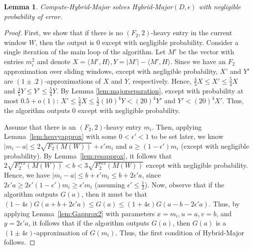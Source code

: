 \documentclass[11pt]{article}
\newtheorem{lem}{Lemma}
\begin{document}
\begin{lem}\label{lem:hybridmajor}
Compute-Hybrid-Major solves Hybrid-Major$(D, \epsilon)$ with negligible probability of error.
\end{lem}
\begin{proof}

First, we show that if there is no $(F_2,2)$-heavy entry in the current window $W$, then the output
is $0$ except with negligible probability.  Consider a single iteration of the main loop of the algorithm.
Let $M'$ be the vector with entries $m_i^2$ and denote
$X = \langle M', H \rangle, Y = |M'| - \langle M', H \rangle$.
Since we have an $F_2$ approximation over sliding windows, except with negligible probability, $X'$ and $Y'$ are $(1 \pm .2)$-approximations
of $X$ and $Y$, respectively.  Hence, $\frac{4}{5}X \leq X' \leq \frac{5}{4}X$ and $\frac{4}{5}Y \leq Y' \leq \frac{5}{4}Y$.
By Lemma \ref{lem:majorseparation}, except with probability at most $0.5+o(1)$:
$X' \le \frac{5}{4} X \le \frac{5}{2} (10)^4 Y < (20)^4  Y'$ and $Y' < (20)^4 X'$.
Thus, the algorithm outputs $0$ except with negligible probability.

Assume that there is an $(F_2,2)$-heavy entry $m_i$.
Then, applying Lemma~\ref{lem:heavyapprox} with some $0 < \epsilon' < 1$ to be set later, we know
$|m_i - a| \le 2\sqrt{F_2(M(W))} + \epsilon' m_i$ and $a \geq (1-\epsilon')m_i$
(except with negligible probability).
By Lemma~\ref{lem:resapprox},
it follows that $2\sqrt{F^{res}_2(M(W))} < b < 3\sqrt{F^{res}_2(M(W))}$ except with negligible probability.
Hence, we have $|m_i - a| \leq b + \epsilon' m_i \leq b + 2 \epsilon' a$, since
$2 \epsilon' a \geq 2 \epsilon' (1- \epsilon')m_i \geq \epsilon' m_i$ (assuming $\epsilon' \leq \frac{1}{2}$).
Now, observe that if the algorithm outputs $G(a)$, then it must be that
$(1-4\epsilon)G(a+b+2 \epsilon' a) \leq G(a) \leq (1+4\epsilon)G(a-b-2 \epsilon' a)$.
Thus, by applying Lemma~\ref{lem:Gapprox2} with parameters $x=m_i, u = a, v = b$, and $y=2 \epsilon' a$,
it follows that if the algorithm outputs $G(a)$, then $G(a)$ is a $(1\pm 4\epsilon)$-approximation of $G(m_i)$.
Thus, the first condition of Hybrid-Major follows.


\end{proof}
\end{document}
